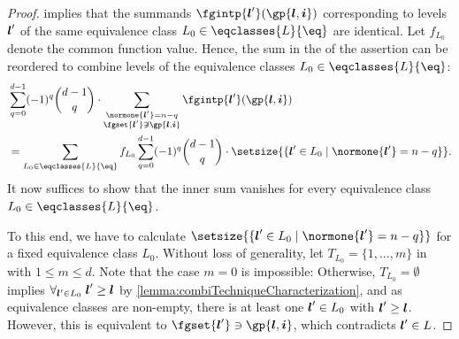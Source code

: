 \begin{proof}
  implies that the summands $\fgintp{\*l'}(\gp{\*l,\*i})$
  corresponding to levels ${\boldsymbol{l}}'$ of the same equivalence class
  $L_0 \in \eqclasses{L}{\eq}$ are identical.
  Let $f_{L_0}$ denote the common function value.
  Hence, the sum in the \lhs of the assertion can be reordered to combine
  levels of the equivalence classes $L_0 \in \eqclasses{L}{\eq}$:
  \begin{subequations}
    \begin{align}
      &\sum_{q=0}^{d-1} (-1)^q \binom{d-1}{q} \cdot
      \sum_{\substack{\normone{\*l'} = n - q\\\fgset{\*l'} \notni \gp{\*l,\*i}}}
      \fgintp{\*l'}(\gp{\*l,\*i})\\
      \label{eq:proofCombiTechniqueIdenticalValues2}
      &= \sum_{L_0 \in \eqclasses{L}{\eq}} f_{L_0} \sum_{q=0}^{d-1}
      (-1)^q \binom{d-1}{q} \cdot
      \setsize{\{\*l' \in L_0 \mid \normone{\*l'} = n - q\}}.
    \end{align}
  \end{subequations}
  It now suffices to show that the inner sum vanishes
  for every equivalence class $L_0 \in \eqclasses{L}{\eq}$.
  
  To this end, we have to calculate
  $\setsize{\{\*l' \in L_0 \mid \normone{\*l'} = n - q\}}$
  for a fixed equivalence class $L_0$.
  Without loss of generality,
  let $T_{L_0} = \{1, \dotsc, m\}$ in
  with $1 \le m \le d$.
  Note that the case $m = 0$ is impossible:
  Otherwise, $T_{L_0} = \emptyset$ implies
  $\forall_{{\boldsymbol{l}}' \in L_0}\;{\boldsymbol{l}}' \ge {\boldsymbol{l}}$ by
  \cref{lemma:combiTechniqueCharacterization}, and
  as equivalence classes are non-empty,
  there is at least one ${\boldsymbol{l}}' \in L_0$ with ${\boldsymbol{l}}' \ge {\boldsymbol{l}}$.
  However, this is equivalent to $\fgset{\*l'} \ni \gp{\*l,\*i}$,
  which contradicts ${\boldsymbol{l}}' \in L$.
  

\end{proof}

